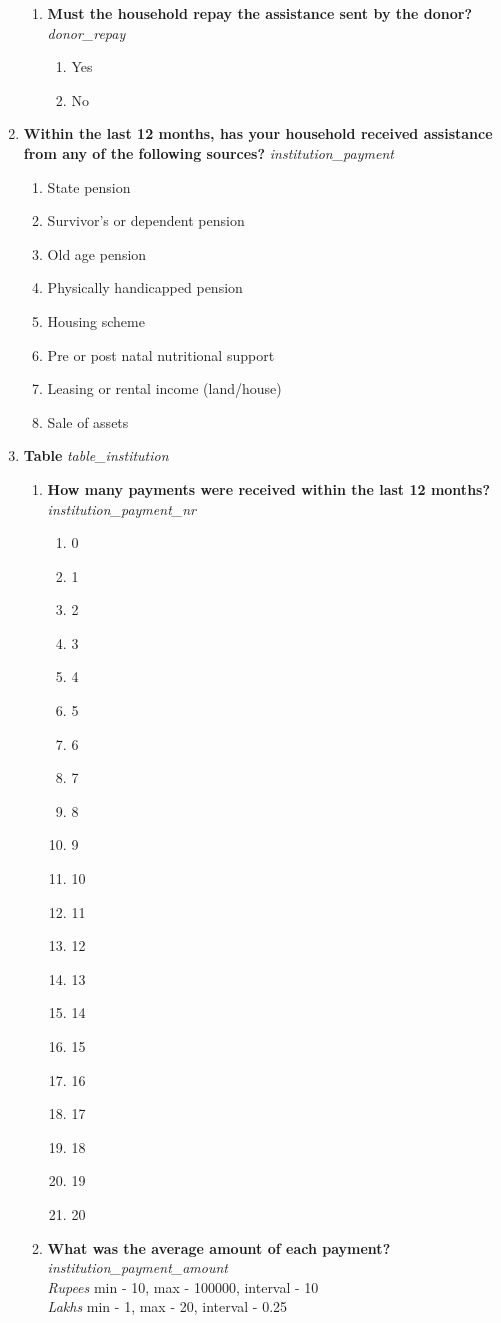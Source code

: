 \documentclass{article}
\begin{document}
\begin{enumerate}
\begin{enumerate}[label*=\arabic*.]
\item {\bfseries Must the household repay the assistance sent by the donor?}\emph{ donor\_repay } 
\begin{enumerate} 
\item Yes 
\item No 
\end{enumerate} 
\end{enumerate} 
\item {\bfseries Within the last 12 months, has your household received assistance from any of the following sources? }\emph{ institution\_payment } 
\begin{enumerate} 
\item State pension 
\item Survivor's or dependent pension 
\item Old age pension 
\item Physically handicapped pension 
\item Housing scheme 
\item Pre or post natal nutritional support 
\item Leasing or rental income (land/house) 
\item Sale of assets 
\end{enumerate} 
\item {\bfseries Table}\emph{ table\_institution } 
\begin{enumerate}[label*=\arabic*.] 
\item {\bfseries How many payments were received within the last 12 months?}\emph{ institution\_payment\_nr } 
\begin{enumerate} 
\item 0 
\item 1 
\item 2 
\item 3 
\item 4 
\item 5 
\item 6 
\item 7 
\item 8 
\item 9 
\item 10 
\item 11 
\item 12 
\item 13 
\item 14 
\item 15 
\item 16 
\item 17 
\item 18 
\item 19 
\item 20 
\end{enumerate} 
\item {\bfseries What was the average amount of each payment?}\emph{ institution\_payment\_amount } 
\\ \emph{ Rupees }min - 10, max - 100000, interval - 10 
\\ \emph{ Lakhs }min - 1, max - 20, interval - 0.25 
 

\end{enumerate}
\end{enumerate}
\end{document}

